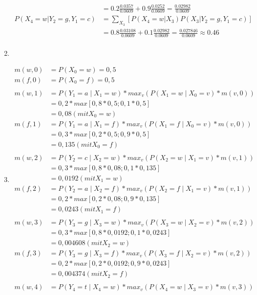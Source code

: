 \documentclass[a4paper,10pt]{article}
\begin{document}
\begin{enumerate}[~~(a)]
\begin{align*}
        &= 0.2 \frac{0.0357}{0.0609} + 0.9 \frac{0.0252}{0.0609} = \frac{0.02982}{0.0609}\\
        P(X_4 = w| Y_2 = g, Y_1 = c) &= \sum\limits_{X_3} [P(X_4 = w|X_3) P(X_3|Y_2 = g, Y_1 = c)]\\
        &= 0.8 \frac{0.03108}{0.0609} + 0.1 \frac{0.02982}{0.0609} = \frac{0.027846}{0.0609} \approx 0.46\\
    \end{align*}
    \item
    \item
	\begin{align*}
		m(w,0) &= P(X_0 = w) = 0,5 \\
		m(f,0) &= P(X_0 = f) = 0,5\\ \\
		m(w,1) &= P(Y_1 = a \mid X_1 = w) * max_v (P(X_1 = w \mid X_0 = v) * m(v,0)) \\
		&= 0,2 * max[0,8*0,5;0,1*0,5]\\
		&= 0,08  (mit X_0 = w)\\
		m(f,1) &= P(Y_1 = a \mid X_1 = f) * max_v (P(X_1 = f \mid X_0 = v) * m(v,0)) \\
		&= 0,3 * max[0,2*0,5;0,9*0,5]\\
		&= 0,135  (mit X_0 = f)\\ \\
		m(w,2) &= P(Y_2 = c \mid X_2 = w) * max_v (P(X_2 = w \mid X_1 = v) * m(v,1)) \\
		&= 0,3 * max[0,8*0,08;0,1*0,135]\\
		&= 0,0192  (mit X_1 = w)\\
		m(f,2) &= P(Y_2 = a \mid X_2 = f) * max_v (P(X_2 = f \mid X_1 = v) * m(v,1)) \\
		&= 0,2 * max[0,2*0,08;0,9*0,135]\\
		&= 0,0243  (mit X_1 = f)\\ \\
		m(w,3) &= P(Y_3 = g \mid X_3 = w) * max_v (P(X_3 = w \mid X_2 = v) * m(v,2)) \\
		&= 0,3 * max[0,8*0,0192;0,1*0,0243]\\
		&= 0,004608  (mit X_2 = w)\\
		m(f,3) &= P(Y_3 = g \mid X_3 = f) * max_v (P(X_3 = f \mid X_2 = v) * m(v,2)) \\
		&= 0,2 * max[0,2*0,0192;0,9*0,0243]\\
		&= 0,004374  (mit X_2 = f)\\ \\
		m(w,4) &= P(Y_4 = t \mid X_4 = w) * max_v (P(X_4 = w \mid X_3 = v) * m(v,3)) \\

\end{align*}
\end{enumerate}
\end{document}
